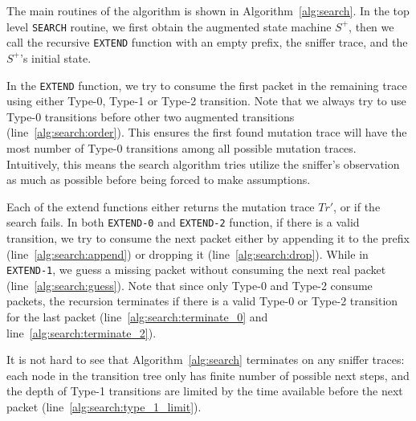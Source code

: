 The main routines of the algorithm is shown in Algorithm~\ref{alg:search}.  In
the top level \texttt{SEARCH} routine, we first obtain the augmented state
machine $S^+$, then we call the recursive \texttt{EXTEND} function with an empty
prefix, the sniffer trace, and the $S^+$'s initial state. 

In the \texttt{EXTEND} function, we try to consume the first packet in the
remaining trace using either Type-0, Type-1 or Type-2 transition.
Note that we always try to use Type-0 transitions before other two augmented
transitions (line~\ref{alg:search:order}).
This ensures the first found mutation trace will have the most number of Type-0
transitions among all possible mutation traces.
Intuitively, this means the search algorithm tries utilize the sniffer's
observation as much as possible before being forced to make assumptions.


Each of the extend functions either returns the mutation trace $Tr'$, or
\textit{\nil} if the search fails.
In both \texttt{EXTEND-0} and
\texttt{EXTEND-2} function, if there is a valid transition, we try to consume
the next packet either by appending it to the prefix
(line~\ref{alg:search:append}) or dropping it (line~\ref{alg:search:drop}).
While in \texttt{EXTEND-1}, we guess a missing packet without consuming the next
real packet (line~\ref{alg:search:guess}).
Note that since only Type-0 and Type-2 consume packets, the recursion terminates
if there is a valid Type-0 or Type-2 transition for the last packet
(line~\ref{alg:search:terminate_0} and line~\ref{alg:search:terminate_2}).



It is not hard to see that Algorithm~\ref{alg:search} terminates on any sniffer
traces: each node in the transition tree only has finite number of possible next
steps, and the depth of Type-1 transitions are limited by the time available
before the next packet (line~\ref{alg:search:type_1_limit}).
